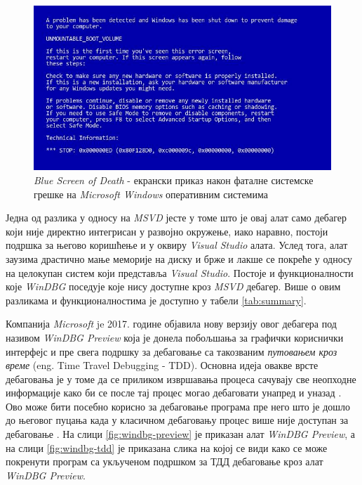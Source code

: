 \documentclass[a4paper]{article}
\begin{document}
\begin{figure}
    \begin{center}
        \includegraphics[width=\textwidth]{slike/plavi_ekran_smrti.jpg}
    \end{center}
    \caption{{\em Blue Screen of Death} - екрански приказ након фаталне 
    системске грешке на {\em Microsoft Windows} оперативним системима}
    \label{fig:blueScreen}
\end{figure}

Једна од разлика у односу на {\em MSVD} јесте у томе што је 
овај алат само дебагер који није директно интегрисан
у развојно окружење, иако наравно, постоји подршка за 
његово коришћење и у оквиру {\em Visual Studio} алата.
Услед тога, алат заузима драстично мање меморије на диску
и брже и лакше се покреће у односу на целокупан
систем који представља {\em Visual Studio}. Постоје и 
функционалности које {\em WinDBG} поседује које нису доступне
кроз {\em MSVD} дебагер. Више о овим разликама и 
функционалностима је доступно у табели \ref{tab:summary}.

Компанија {\em Microsoft} je 2017. године објавила нову 
верзију овог дебагера под називом {\em WinDBG Preview}
која је донела побољшања за графички кориснички интерфејс и 
пре свега подршку за дебаговање са такозваним
{\em путовањем кроз време} (eng. Time Travel Debugging - TDD).
Основна идеја овакве врсте дебаговања је у томе
да се приликом извршавања процеса сачувају све неопходне 
информације како би се после тај процес могао дебаговати
унапред и уназад \cite{tdd}. Ово може бити посебно корисно за 
дебаговање програма пре него што је дошло до његовог пуцања
када у класичном дебаговању процес више није доступан за 
дебаговање \cite{windbgx}. На слици \ref{fig:windbg-preview} 
је приказан алат {\em WinDBG Preview}, а на слици \ref{fig:windbg-tdd} 
је приказана слика на којој се види како се може покренути 
програм са укљученом подршком за ТДД дебаговање
кроз алат {\em WinDBG Preview}.
\end{document}
